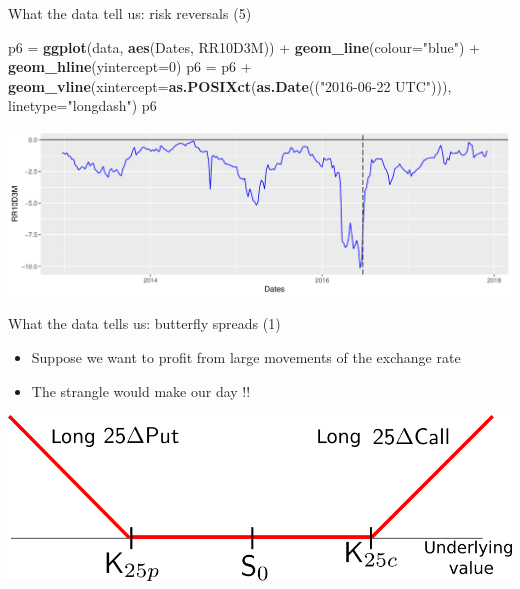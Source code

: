 \documentclass[ignorenonframetext,aspectratio=169]{beamer}
\newenvironment{Shaded}{}{}
\newcommand{\KeywordTok}[1]{\textcolor[rgb]{0.00,0.44,0.13}{\textbf{#1}}}
\newcommand{\DataTypeTok}[1]{\textcolor[rgb]{0.56,0.13,0.00}{#1}}
\newcommand{\DecValTok}[1]{\textcolor[rgb]{0.25,0.63,0.44}{#1}}
\newcommand{\StringTok}[1]{\textcolor[rgb]{0.25,0.44,0.63}{#1}}
\newcommand{\OperatorTok}[1]{\textcolor[rgb]{0.40,0.40,0.40}{#1}}
\newcommand{\NormalTok}[1]{#1}
\providecommand{\tightlist}{%
  \setlength{\itemsep}{0pt}\setlength{\parskip}{0pt}}
\begin{document}
\begin{frame}[fragile]{What the data tell us: risk reversals (5)}

\begin{Shaded}
\begin{Highlighting}[]
\NormalTok{p6 =}\StringTok{ }\KeywordTok{ggplot}\NormalTok{(data, }\KeywordTok{aes}\NormalTok{(Dates, RR10D3M)) }\OperatorTok{+}\StringTok{ }\KeywordTok{geom_line}\NormalTok{(}\DataTypeTok{colour=}\StringTok{"blue"}\NormalTok{) }\OperatorTok{+}\StringTok{ }
\StringTok{        }\KeywordTok{geom_hline}\NormalTok{(}\DataTypeTok{yintercept=}\DecValTok{0}\NormalTok{)}
\NormalTok{p6 =}\StringTok{ }\NormalTok{p6 }\OperatorTok{+}\StringTok{ }\KeywordTok{geom_vline}\NormalTok{(}\DataTypeTok{xintercept=}\KeywordTok{as.POSIXct}\NormalTok{(}\KeywordTok{as.Date}\NormalTok{((}\StringTok{"2016-06-22 UTC"}\NormalTok{))),}
                     \DataTypeTok{linetype=}\StringTok{"longdash"}\NormalTok{)}
\NormalTok{p6}
\end{Highlighting}
\end{Shaded}

\includegraphics[width=1\linewidth]{2018_02_07_IMF_FXCourse_files/figure-beamer/unnamed-chunk-15-1}

\end{frame}

\begin{frame}{What the data tells us: butterfly spreads (1)}

\begin{itemize}
\tightlist
\item
  Suppose we want to profit from large movements of the exchange rate
\item
  The strangle would make our day !!
\end{itemize}

\begin{center}\includegraphics[width=0.7\linewidth]{images/fig25BFSimple} \end{center}

\end{frame}
\end{document}
